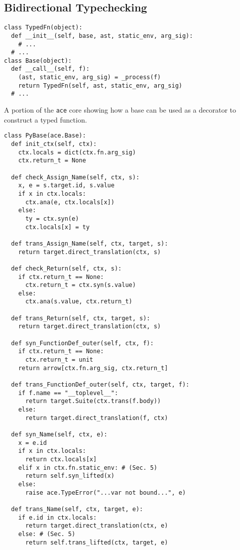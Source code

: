 \documentclass[10pt,preprint]{sigplanconf}
\begin{document}
{\subsection{Bidirectional Typechecking}
\begin{codelisting}
\begin{lstlisting}
class TypedFn(object):
  def __init__(self, base, ast, static_env, arg_sig):
    # ...
  # ...
class Base(object):
  def __call__(self, f):
    (ast, static_env, arg_sig) = _process(f)
    return TypedFn(self, ast, static_env, arg_sig)
  # ...
\end{lstlisting}
\caption{A portion of the \texttt{ace} core showing how a base can be used as a decorator to construct a typed function.}
\label{base}
\end{codelisting}

\begin{codelisting}
\begin{lstlisting}
class PyBase(ace.Base):
  def init_ctx(self, ctx):
    ctx.locals = dict(ctx.fn.arg_sig)
    ctx.return_t = None

  def check_Assign_Name(self, ctx, s):
    x, e = s.target.id, s.value
    if x in ctx.locals:
      ctx.ana(e, ctx.locals[x])
    else:
      ty = ctx.syn(e)
      ctx.locals[x] = ty
	  
  def trans_Assign_Name(self, ctx, target, s):
    return target.direct_translation(ctx, s)
              
  def check_Return(self, ctx, s):
    if ctx.return_t == None:
      ctx.return_t = ctx.syn(s.value)
    else:
      ctx.ana(s.value, ctx.return_t)
      
  def trans_Return(self, ctx, target, s):
    return target.direct_translation(ctx, s)
          
  def syn_FunctionDef_outer(self, ctx, f):
    if ctx.return_t == None:
      ctx.return_t = unit
    return arrow[ctx.fn.arg_sig, ctx.return_t]
    
  def trans_FunctionDef_outer(self, ctx, target, f):
    if f.name == "__toplevel__":
      return target.Suite(ctx.trans(f.body))
    else:
      return target.direct_translation(f, ctx)

  def syn_Name(self, ctx, e):
    x = e.id
    if x in ctx.locals:
      return ctx.locals[x]
    elif x in ctx.fn.static_env: # (Sec. 5)
      return self.syn_lifted(x)
    else:
      raise ace.TypeError("...var not bound...", e)
      
  def trans_Name(self, ctx, target, e):
    if e.id in ctx.locals:
      return target.direct_translation(ctx, e)
    else: # (Sec. 5)
      return self.trans_lifted(ctx, target, e)
  

\end{lstlisting}
\end{codelisting}}
\end{document}
